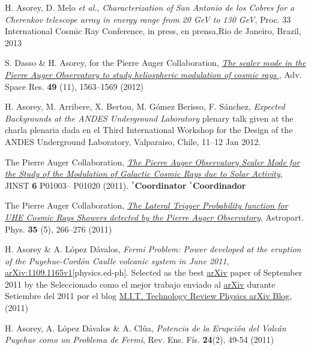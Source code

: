 \begin{etaremune}
\item {}H. Asorey, D. Melo {\emph{et al.}}, {\emph{Characterization of San Antonio de los Cobres for a Cherenkov telescope array in energy range from 20 GeV to 130 GeV}}, \en Proc. 33 International Cosmic Ray Conference, \ifeng in press, \else en prensa,\fi  Rio de Janeiro, Brazil, 2013

\item {}S. Dasso \& H. Asorey, for the Pierre Auger Collaboration,
\href{http://dx.doi.org/10.1016/j.asr.2011.12.028}{\emph{ The scaler mode in
the Pierre Auger Observatory to study heliospheric modulation of cosmic rays
}}, Adv. Space Res. {\bf{49}} (11), 1563--1569 (2012)

\item {} H. Asorey, M. Arribere, X. Bertou, M. Gómez Berisso, F. Sánchez,
{\emph{Expected Backgrounds at the ANDES Underground Laboratory}}
\ifeng
plenary talk given at the
\else 
charla plenaria dada en el
\fi
Third International Workshop for the Design of the ANDES Underground Laboratory, Valparaiso, Chile, 11--12 Jan 2012.

\item {}The Pierre Auger Collaboration,
\href{http://dx.doi.org/10.1088/1748-0221/6/01/P01003}{\emph{The Pierre Auger
Observatory Scaler Mode for the Study of the Modulation of Galactic Cosmic Rays
due to Solar Activity}}, JINST {\bf 6} P01003--
P01020 (2011).
\ifeng $^*${\bf{Coordinator}} \else $^*${\bf{Coordinador}} \fi

\item {} The Pierre Auger Collaboration, 
\href{http://dx.doi.org/10.1016/j.astropartphys.2011.08.001}{\emph{The Lateral
Trigger Probability function for UHE Cosmic Rays Showers detected by the Pierre
Auger Observatory}}, Astropart. Phys. {\bf{35}} (5), 266--276 (2011)

\item {}H. Asorey \& A. López Dávalos, {\emph{Fermi Problem: Power
developed at the eruption of the Puyehue-Cordón Caulle volcanic system in June
2011}}, \href{http://arxiv.org/abs/1109.1165}{arXiv:1109.1165v1}[physics.ed-ph]. \ifeng
Selected as the best \href{http://arxiv.org}{arXiv} paper of September 2011 by the
\else
Seleccionado como el mejor trabajo enviado al \href{http://arxiv.org}{arXiv} durante Setiembre del 2011 por el blog 
\fi
\href{http://www.technologyreview.com/blog/arxiv/27140/}{M.I.T. Technology
Review Physics arXiv Blog}, (2011)

\item {}H. Asorey, A. López Dávalos \& A. Clúa, {\emph{Potencia de la Erupción del Volcán Puyehue como un Problema de Fermi}}, Rev. Ens. Fís. {\bf{24}}(2), 49-54 (2011)


\end{etaremune}
